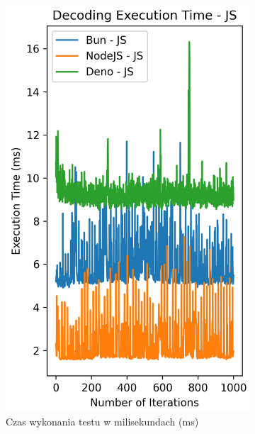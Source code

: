 \begin{figure}[H]
  \centering
  \begin{subfigure}[b]{0.4\textwidth}
    \centering
    \includegraphics[width=\textwidth]{Figures/coding/base64_1000_decoding_js_time.png}
    \caption{Czas wykonania testu w milisekundach (ms)}
    \label{fig:decoding_e2_js_time}
  \end{subfigure}
  \begin{subfigure}[b]{0.4\textwidth}
    \centering

\end{subfigure}
\end{figure}
